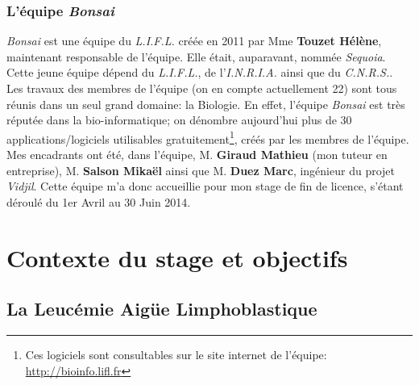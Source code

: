\documentclass[12pt]{report}
\begin{document}
\begin{spacing}{1.2}
\subsection{L'équipe \textit{Bonsai}}
\textit{Bonsai} est une équipe du \textit{L.I.F.L.} créée en 2011 par Mme \textbf{Touzet Hélène}, maintenant responsable de l'équipe. Elle était, auparavant, nommée \textit{Sequoia}.
\newline
Cette jeune équipe dépend du \textit{L.I.F.L.}, de l'\textit{I.N.R.I.A.} ainsi que du \textit{C.N.R.S.}.
\newline
Les travaux des membres de l'équipe (on en compte actuellement 22) sont tous réunis dans un seul grand domaine: la Biologie.
\newline
En effet, l'équipe \textit{Bonsai} est très réputée dans la bio-informatique; on dénombre aujourd'hui plus de 30 applications/logiciels utilisables gratuitement\footnote{Ces logiciels sont consultables sur le site internet de l'équipe: \url{http://bioinfo.lifl.fr}}, créés par les membres de l'équipe.
\newline
Mes encadrants ont été, dans l'équipe, M. \textbf{Giraud Mathieu} (mon tuteur en entreprise), M. \textbf{Salson Mikaël} ainsi que M. \textbf{Duez Marc}, ingénieur du projet \textit{Vidjil}.
\newline
Cette équipe m'a donc accueillie pour mon stage de fin de licence, s'étant déroulé du 1er Avril au 30 Juin 2014.


\chapter{Contexte du stage et objectifs}

\section{La Leucémie Aigüe Limphoblastique}


\end{spacing}
\end{document}

